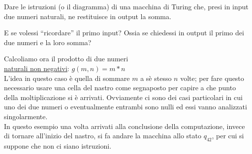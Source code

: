 \begin{extra}
Dare le istruzioni (o il diagramma) di una macchina di Turing che, presi in input due numeri naturali, ne restituisce in output la somma. 

E se volessi ``ricordare'' il primo input? Ossia se chiedessi in output il primo dei due numeri e la loro somma? 
\end{extra}

\begin{esempio}[Prodotto]
Calcoliamo ora il prodotto di due numeri\\ \underline{naturali non
  negativi}: $g(m,n) = m * n$\\

L'idea in questo caso \`e quella di sommare $m$ a s\`e stesso $n$
volte; per fare questo necessario usare una cella del nastro come
segnaposto per capire a che punto della moltiplicazione si \`e
arrivati. Ovviamente ci sono dei casi particolari in cui uno dei due
numeri o eventualmente entrambi sono nulli ed essi vanno analizzati
singolarmente.\\

In questo esempio una volta arrivati alla conclusione della
computazione, invece di tornare all'inizio del nastro, si fa andare la
macchina allo stato $q_{42}$, per cui si suppone che non ci siano
istruzioni.\\


\end{esempio}
